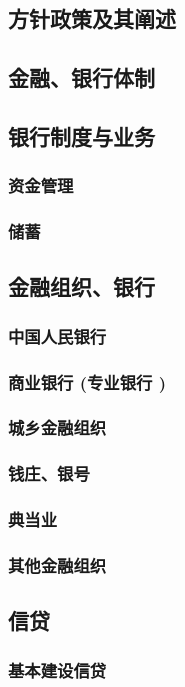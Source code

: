 \documentclass[UTF8]{../../RepresentationUniverse}
\begin{document}
\subsection{方针政策及其阐述}
\subsection{金融、银行体制}
\subsection{银行制度与业务}
    \subsubsection{资金管理}
    \subsubsection{储蓄}
\subsection{金融组织、银行}
    \subsubsection{中国人民银行}
    \subsubsection{商业银行 (专业银行 )}
    \subsubsection{城乡金融组织}
    \subsubsection{钱庄、银号}
    \subsubsection{典当业}
    \subsubsection{其他金融组织}
\subsection{信贷}
    \subsubsection{基本建设信贷}
\end{document}
